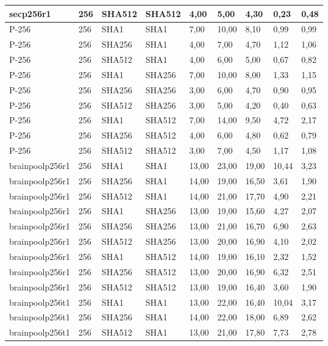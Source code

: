 \begin{longtable}{| l | l | l | l | l |l |l |l |l |}
secp256r1 & 256 & SHA512 & SHA512 & 4,00 & 5,00 & 4,30 & 0,23 & 0,48 \\ \hline 
P-256 & 256 & SHA1 & SHA1 & 7,00 & 10,00 & 8,10 & 0,99 & 0,99 \\ \hline 
P-256 & 256 & SHA256 & SHA1 & 4,00 & 7,00 & 4,70 & 1,12 & 1,06 \\ \hline 
P-256 & 256 & SHA512 & SHA1 & 4,00 & 6,00 & 5,00 & 0,67 & 0,82 \\ \hline 
P-256 & 256 & SHA1 & SHA256 & 7,00 & 10,00 & 8,00 & 1,33 & 1,15 \\ \hline 
P-256 & 256 & SHA256 & SHA256 & 3,00 & 6,00 & 4,70 & 0,90 & 0,95 \\ \hline 
P-256 & 256 & SHA512 & SHA256 & 3,00 & 5,00 & 4,20 & 0,40 & 0,63 \\ \hline 
P-256 & 256 & SHA1 & SHA512 & 7,00 & 14,00 & 9,50 & 4,72 & 2,17 \\ \hline 
P-256 & 256 & SHA256 & SHA512 & 4,00 & 6,00 & 4,80 & 0,62 & 0,79 \\ \hline 
P-256 & 256 & SHA512 & SHA512 & 3,00 & 7,00 & 4,50 & 1,17 & 1,08 \\ \hline 
brainpoolp256r1 & 256 & SHA1 & SHA1 & 13,00 & 23,00 & 19,00 & 10,44 & 3,23 \\ \hline 
brainpoolp256r1 & 256 & SHA256 & SHA1 & 14,00 & 19,00 & 16,50 & 3,61 & 1,90 \\ \hline 
brainpoolp256r1 & 256 & SHA512 & SHA1 & 14,00 & 21,00 & 17,70 & 4,90 & 2,21 \\ \hline 
brainpoolp256r1 & 256 & SHA1 & SHA256 & 13,00 & 19,00 & 15,60 & 4,27 & 2,07 \\ \hline 
brainpoolp256r1 & 256 & SHA256 & SHA256 & 13,00 & 21,00 & 16,70 & 6,90 & 2,63 \\ \hline 
brainpoolp256r1 & 256 & SHA512 & SHA256 & 13,00 & 20,00 & 16,90 & 4,10 & 2,02 \\ \hline 
brainpoolp256r1 & 256 & SHA1 & SHA512 & 14,00 & 19,00 & 16,10 & 2,32 & 1,52 \\ \hline 
brainpoolp256r1 & 256 & SHA256 & SHA512 & 13,00 & 20,00 & 16,90 & 6,32 & 2,51 \\ \hline 
brainpoolp256r1 & 256 & SHA512 & SHA512 & 13,00 & 19,00 & 16,40 & 3,60 & 1,90 \\ \hline 
brainpoolp256t1 & 256 & SHA1 & SHA1 & 13,00 & 22,00 & 16,40 & 10,04 & 3,17 \\ \hline 
brainpoolp256t1 & 256 & SHA256 & SHA1 & 14,00 & 22,00 & 18,00 & 6,89 & 2,62 \\ \hline 
brainpoolp256t1 & 256 & SHA512 & SHA1 & 13,00 & 21,00 & 17,80 & 7,73 & 2,78 \\ \hline 

\end{longtable}
